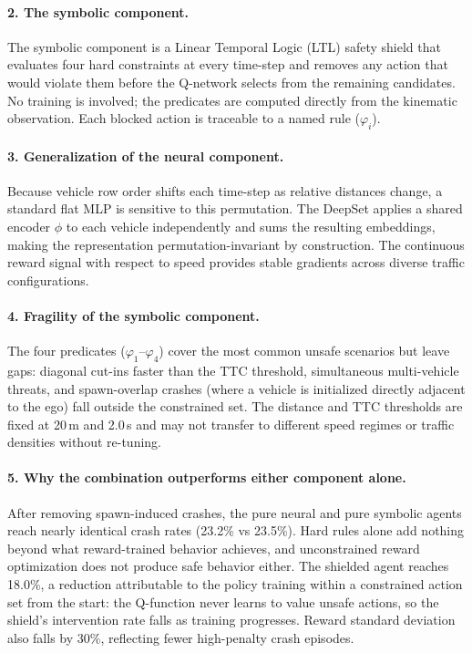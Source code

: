 \documentclass[11pt,a4paper]{article}
\begin{document}
\paragraph{2. The symbolic component.}
The symbolic component is a Linear Temporal Logic (LTL) safety shield that evaluates four hard constraints at every time-step and removes any action that would violate them before the Q-network selects from the remaining candidates. No training is involved; the predicates are computed directly from the kinematic observation. Each blocked action is traceable to a named rule (\(\varphi_i\)).

\paragraph{3. Generalization of the neural component.}
Because vehicle row order shifts each time-step as relative distances change, a standard flat MLP is sensitive to this permutation. The DeepSet applies a shared encoder \(\phi\) to each vehicle independently and sums the resulting embeddings, making the representation permutation-invariant by construction. The continuous reward signal with respect to speed provides stable gradients across diverse traffic configurations.

\paragraph{4. Fragility of the symbolic component.}
The four predicates (\(\varphi_1\)--\(\varphi_4\)) cover the most common unsafe scenarios but leave gaps: diagonal cut-ins faster than the TTC threshold, simultaneous multi-vehicle threats, and spawn-overlap crashes (where a vehicle is initialized directly adjacent to the ego) fall outside the constrained set. The distance and TTC thresholds are fixed at 20\,m and 2.0\,s and may not transfer to different speed regimes or traffic densities without re-tuning.

\paragraph{5. Why the combination outperforms either component alone.}
After removing spawn-induced crashes, the pure neural and pure symbolic agents reach nearly identical crash rates (23.2\% vs 23.5\%). Hard rules alone add nothing beyond what reward-trained behavior achieves, and unconstrained reward optimization does not produce safe behavior either. The shielded agent reaches 18.0\%, a reduction attributable to the policy training within a constrained action set from the start: the Q-function never learns to value unsafe actions, so the shield's intervention rate falls as training progresses. Reward standard deviation also falls by 30\%, reflecting fewer high-penalty crash episodes.
\end{document}
